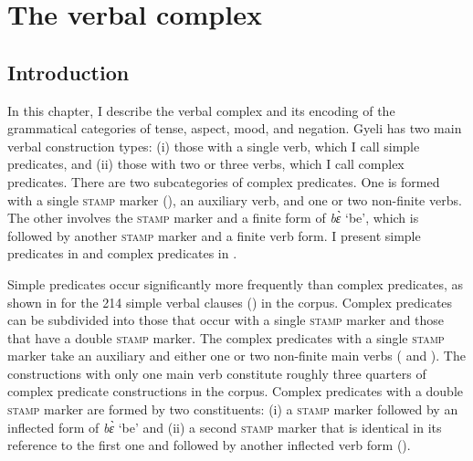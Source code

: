 \chapter{The verbal complex}
\label{sec:TAM}

\section{Introduction}
\label{sec:TAMIntro}


In this chapter, I describe the verbal complex and its encoding of the grammatical categories of tense, aspect, mood, and negation. Gyeli has two main verbal construction types: (i) those with a single verb, which I call simple predicates, and (ii) those with two or three verbs, which I call complex predicates. There are two subcategories of complex predicates. One is formed with a single \textsc{stamp} marker (), an auxiliary verb, and one or two non-finite verbs. The other involves the \textsc{stamp} marker and a finite form of {\itshape bɛ̀} `be', which is followed by another \textsc{stamp} marker and a finite verb form. I present simple predicates in  and complex predicates in . 

Simple predicates occur significantly more frequently than complex predicates, as shown in  for the 214 simple verbal clauses () in the corpus.  Complex predicates can be subdivided into those that occur with a single \textsc{stamp} marker and those that have a double \textsc{stamp} marker. The complex predicates with a single \textsc{stamp} marker take an auxiliary and either one or two non-finite main verbs ( and ). The constructions with only one main verb constitute roughly three quarters of complex predicate constructions in the corpus. Complex predicates with a double \textsc{stamp} marker are formed by two constituents: (i) a \textsc{stamp} marker followed by an inflected form of {\itshape bɛ̀} `be' and (ii)  a second \textsc{stamp} marker that is identical in its reference to the first one and followed by another inflected verb form ().

